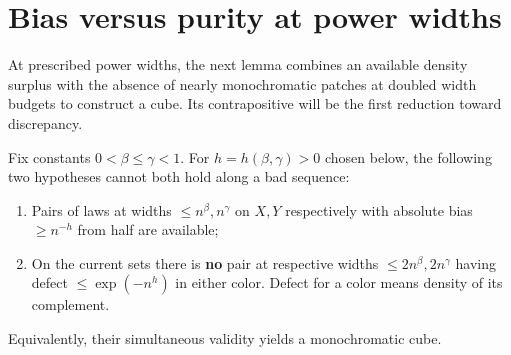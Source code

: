 \section{Bias versus purity at power widths}
\label{sec:bias-versus-purity-at-power-widths}

At prescribed power widths, the next lemma combines an available density
surplus with the absence of nearly monochromatic patches at doubled width
budgets to construct a cube. Its contrapositive will be the first reduction
toward discrepancy.

\begin{lemma}\label{lem:bias-purity}
Fix constants \(0<\beta\le\gamma<1\). For \(h=h(\beta,\gamma)>0\) chosen below, the following two hypotheses cannot both hold along a bad sequence:
\begin{enumerate}[label=\textup{(\roman*)}]
\item\label{it:bias-purity-available} Pairs of laws at widths \(\le n^\beta,n^\gamma\) on \(X,Y\) respectively with absolute bias \(\ge n^{-h}\) from half are available;
\item\label{it:bias-purity-excluded} On the current sets there is \textbf{no} pair at respective widths \(\le2n^\beta,2n^\gamma\) having defect \(\le\exp(-n^h)\) in either color. Defect for a color means density of its complement.
\end{enumerate}
Equivalently, their simultaneous validity yields a monochromatic cube.
\end{lemma}

